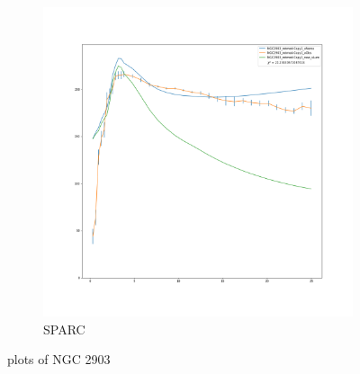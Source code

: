 \documentclass[reprint,%
 amsmath,amssymb,
 aps,
]{revtex4-1}
\begin{document}
\begin{figure}[h]
\begin{subfigure}{.5\textwidth}
  \centering
  \includegraphics[width=.8\linewidth]{NGC2903_rotmod-Copy1_XueSofue.png}
  \caption{SPARC\cite{2016Lelli}}
  \label{fig:sfig16}
\end{subfigure}
\caption{plots of NGC 2903}
\label{fig:fig2903}
\end{figure}
%
\clearpage
%
%  
\end{document}
